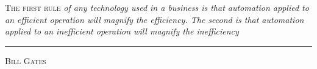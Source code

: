 \newpage
\begin{flushright}
	\begin{minipage}{0.5\textwidth}
		\lettrine{T}{he first rule} \textit{of any technology used in a business is that automation applied to an efficient operation will magnify the efficiency. The second is that automation applied to an inefficient operation will magnify the inefficiency}\\
		\rule{\textwidth}{0.1mm}
		\begin{flushright}
			\textsc{Bill Gates}
		\end{flushright}
	\end{minipage}
\end{flushright}